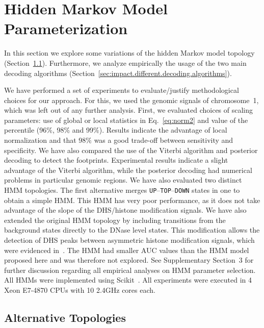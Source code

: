 \section{Hidden Markov Model Parameterization}
\label{sec:hmm.parameterization}

In this section we explore some variations of the hidden Markov model topology (Section~\ref{sec:alternative.topologies}). Furthermore, we analyze empirically the usage of the two main decoding algorithms (Section~\ref{sec:impact.different.decoding.algorithms}).

We have performed a set of experiments to evaluate/justify methodological choices for our
approach. For this, we used the genomic signals of chromosome~1, which was left out of any
further analysis. First, we evaluated choices of scaling parameters: use of global or local
statistics in Eq.~\ref{eq:norm2} and value of the percentile (96$\%$, 98$\%$ and 99$\%$).
Results indicate the advantage of local normalization and that 98$\%$ was a good trade-off
between sensitivity and specificity. We have also compared the use of the Viterbi algorithm
and posterior decoding to detect the footprints. Experimental results indicate a slight
advantage of the Viterbi algorithm, while the posterior decoding had numerical problems
in particular genomic regions. We have also evaluated two distinct HMM topologies. The first
alternative merges {\tt UP}--{\tt TOP}--{\tt DOWN} states in one to obtain a simple HMM. This HMM has
very poor performance, as it does not take advantage of the slope of the DHS/histone modification signals.
We have also extended the original HMM topology by including transitions from the background
states directly to the DNase level states. This modification allows the detection of DHS peaks
between asymmetric histone modification signals, which were evidenced in~\cite{kundaje2012}.
The HMM had smaller AUC values than the HMM model proposed here and was therefore not
explored. See Supplementary Section~3 for further discussion regarding all empirical
analyses on HMM parameter selection. All HMMs were implemented using Scikit~\cite{pedregosa2011}.
All experiments were executed in 4 Xeon E7-4870 CPUs with 10 2.4GHz cores each.

\subsection{Alternative Topologies}
\label{sec:alternative.topologies}

